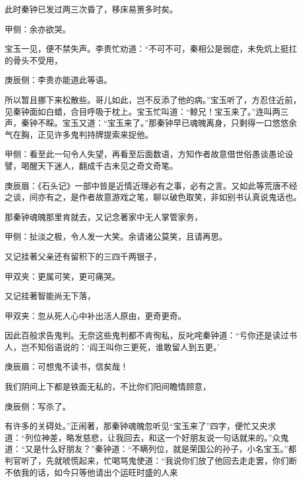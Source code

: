 \begin{parag}
    此时秦钟已发过两三次昏了，移床易箦多时矣。\begin{note}甲侧：余亦欲哭。\end{note}宝玉一见，便不禁失声。李贵忙劝道：“不可不可，秦相公是弱症，未免炕上挺扛的骨头不受用，\begin{note}庚辰侧：李贵亦能道此等语。\end{note}所以暂且挪下来松散些。哥儿如此，岂不反添了他的病。”宝玉听了，方忍住近前，见秦钟面如白蜡，合目呼吸于枕上。宝玉忙叫道：“鲸兄！宝玉来了。”连叫两三声，秦钟不睬。宝玉又道：“宝玉来了。”那秦钟早已魂魄离身，只剩得一口悠悠余气在胸，正见许多鬼判持牌提索来捉他。\begin{note}甲侧：看至此一句令人失望，再看至后面数语，方知作者故意借世俗愚谈愚论设譬，喝醒天下迷人，翻成千古未见之奇文奇笔。\end{note}\begin{note}庚辰眉：《石头记》一部中皆是近情近理必有之事，必有之言。又如此等荒唐不经之谈，间亦有之，是作者故意游戏之笔，聊以破色取笑，非如别书认真说鬼话也。\end{note}那秦钟魂魄那里肯就去，又记念著家中无人掌管家务，\begin{note}甲侧：扯淡之极，令人发一大笑。余请诸公莫笑，且请再思。\end{note}又记挂著父亲还有留积下的三四千两银子，\begin{note}甲双夹：更属可笑，更可痛哭。\end{note}又记挂著智能尚无下落，\begin{note}甲双夹：忽从死人心中补出活人原由，更奇更奇。\end{note}因此百般求告鬼判。无奈这些鬼判都不肯徇私，反叱咤秦钟道：“亏你还是读过书人，岂不知俗语说的：‘阎王叫你三更死，谁敢留人到五更。’\begin{note}庚辰眉：可想鬼不读书，信矣哉！\end{note}我们阴间上下都是铁面无私的，不比你们阳间瞻情顾意，\begin{note}庚辰侧：写杀了。\end{note}有许多的关碍处。”正闹著，那秦钟魂魄忽听见“宝玉来了”四字，便忙又央求道：“列位神差，略发慈悲，让我回去，和这一个好朋友说一句话就来的。”众鬼道：“又是什么好朋友？”秦钟道：“不瞒列位，就是荣国公的孙子，小名宝玉。”都判官听了，先就唬慌起来，忙喝骂鬼使道：“我说你们放了他回去走走罢，你们断不依我的话，如今只等他请出个运旺时盛的人来
\end{parag}
